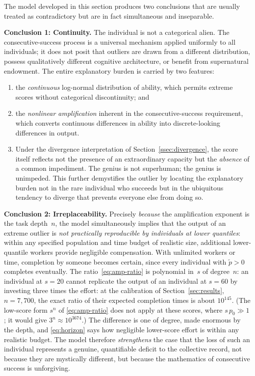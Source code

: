 \documentclass{article}
\begin{document}
The model developed in this section produces two conclusions that are
usually treated as contradictory but are in fact simultaneous and
inseparable.

\medskip
\noindent\textbf{Conclusion 1: Continuity.}\;
The individual is not a categorical alien. The consecutive-success process
is a universal mechanism applied uniformly to all individuals; it does not
posit that outliers are drawn from a different distribution, possess
qualitatively different cognitive architecture, or benefit from supernatural
endowment. The entire explanatory burden is carried by two features:
\begin{enumerate}
  \item[(i)]
    the \emph{continuous} log-normal distribution of ability, which
    permits extreme scores without categorical discontinuity; and
  \item[(ii)]
    the \emph{nonlinear amplification} inherent in the
    consecutive-success requirement, which converts continuous differences
    in ability into discrete-looking differences in output.
  \item[(iii)]
    Under the divergence interpretation of Section~\ref{ssec:divergence}, the score itself reflects not the presence of an extraordinary capacity but the \emph{absence} of a common impediment. The genius is not superhuman; the genius is unimpeded. This further demystifies the outlier by locating the explanatory burden not in the rare individual who succeeds but in the ubiquitous tendency to diverge that prevents everyone else from doing so.
\end{enumerate}

\noindent\textbf{Conclusion 2: Irreplaceability.}\;
Precisely \emph{because} the amplification exponent is the task depth~$n$,
the model simultaneously implies that the output of an extreme outlier is \emph{not practically reproducible by individuals at lower quantiles}: within any specified population and time budget of realistic size, additional lower-quantile workers provide negligible compensation. With unlimited workers or time, completion by someone becomes certain, since every individual with $\widetilde{p} > 0$ completes eventually. The
ratio~\eqref{eq:amp-ratio} is polynomial in~$s$ of degree~$n$: an individual at $s = 20$ cannot replicate the output of an individual at $s = 60$ by investing three times the effort: at the calibration of Section~\ref{sec:results}, $n = 7{,}700$, the exact ratio of their expected completion times is about $10^{145}$. (The low-score form $s^{n}$ of \eqref{eq:amp-ratio} does not apply at these scores, where $s\,p_0 \gg 1$; it would give $3^{n} \approx 10^{3674}$.) The difference is one of degree, made enormous by the depth, and \eqref{eq:horizon} says how negligible lower-score effort is within any realistic budget. The model therefore \emph{strengthens} the case that the loss of
such an individual represents a genuine, quantifiable deficit to the
collective record, not because they are mystically different, but because
the mathematics of consecutive success is unforgiving.
\end{document}
